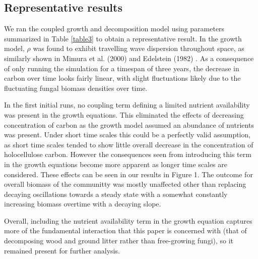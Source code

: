 \documentclass[12pt]{article}
\begin{document}
\begin{multicols}{2}
\subsection{Representative results}
We ran the coupled growth and decomposition model using parameters summarized in Table \ref{table3} to obtain a representative result. In the growth model, $\rho$ was found to exhibit travelling wave dispersion throughout space, as similarly shown in Mimura et al. (2000) and Edelstein (1982) \cite{Mimura2000, Edelstein1982}. As a consequence of only running the simulation for a timespan of three years, the decrease in carbon over time looks fairly linear, with slight fluctuations likely due to the fluctuating fungal biomass densities over time. 

In the first initial runs, no coupling term defining a limited nutrient availability was present in the growth equations. This eliminated the effects of decreasing concentration of carbon as the growth model assumed an abundance of nutrients was present. Under short time scales this could be a perfectly valid assumption, as short time scales tended to show little overall decrease in the concentration of holocellulose carbon. However the consequences seen from introducing this term in the growth equations become more apparent as longer time scales are considered. These effects can be seen in our results in Figure 1. The outcome for overall biomass of the communitty was mostly unaffected other than replacing decaying oscillations towards a steady state with a somewhat constantly increasing biomass overtime with a decaying slope. 

Overall, including the nutrient availability term in the growth equation captures more of the fundamental interaction that this paper is concerned with (that of decomposing wood and ground litter rather than free-growing fungi), so it remained present for further analysis.

\end{multicols}
\end{document}
